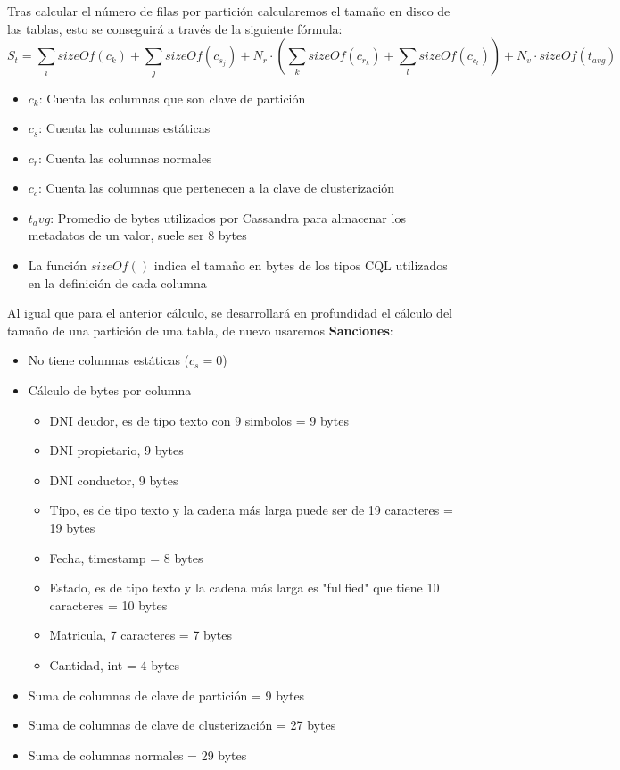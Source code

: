 \documentclass[]{article}
\begin{document}
Tras calcular el número de filas por partición calcularemos el tamaño en disco de las tablas, esto se conseguirá a través de la siguiente fórmula: $$S_t = \sum_i sizeOf(c_k) + \sum_j sizeOf(c_{s_j}) + N_r \cdot (\sum_k sizeOf(c_{r_k}) + \sum_l sizeOf(c_{c_l})) + N_v \cdot sizeOf(t_{avg})$$

\begin{itemize}
    \item $c_k$: Cuenta las columnas que son clave de partición
    \item $c_s$: Cuenta las columnas estáticas
    \item $c_r$: Cuenta las columnas normales
    \item $c_c$: Cuenta las columnas que pertenecen a la clave de clusterización
    \item $t_avg$: Promedio de bytes utilizados por Cassandra para almacenar los metadatos de un valor, suele ser 8 bytes
    \item La función $sizeOf()$ indica el tamaño en bytes de los tipos CQL utilizados en la definición de cada columna
\end{itemize}

Al igual que para el anterior cálculo, se desarrollará en profundidad el cálculo del tamaño de una partición de una tabla, de nuevo usaremos \textbf{Sanciones}:
\begin{itemize}
    \item No tiene columnas estáticas ($c_s = 0$)
    \item Cálculo de bytes por columna
    \begin{itemize}
        \item DNI deudor, es de tipo texto con 9 simbolos = 9 bytes
        \item DNI propietario, 9 bytes
        \item DNI conductor, 9 bytes
        \item Tipo, es de tipo texto y la cadena más larga puede ser de 19 caracteres = 19 bytes
        \item Fecha, timestamp = 8 bytes
        \item Estado, es de tipo texto y la cadena más larga es "fullfied" que tiene 10 caracteres = 10 bytes
        \item Matricula, 7 caracteres = 7 bytes
        \item Cantidad, int = 4 bytes
    \end{itemize}
    \item Suma de columnas de clave de partición = 9 bytes
    \item Suma de columnas de clave de clusterización = 27 bytes
    \item Suma de columnas normales = 29 bytes
\end{itemize}
\end{document}
